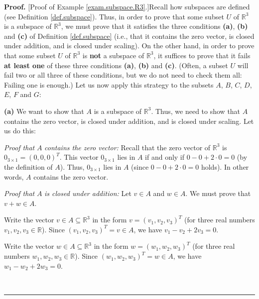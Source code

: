 \documentclass[numbers=enddot,12pt,final,onecolumn,notitlepage]{scrartcl}%
\theoremstyle{definition}
\newenvironment{proof}[1][Proof]{\noindent\textbf{#1.} }{\ \rule{0.5em}{0.5em}}
\begin{document}
\begin{proof}
[Proof of Example \ref{exam.subspace.R3}.]Recall how subspaces are defined
(see Definition \ref{def.subspace}). Thus, in order to prove that some subset
$U$ of $\mathbb{R}^{3}$ is a subspace of $\mathbb{R}^{3}$, we must prove that
it satisfies the three conditions \textbf{(a)}, \textbf{(b)} and \textbf{(c)}
of Definition \ref{def.subspace} (i.e., that it contains the zero vector, is
closed under addition, and is closed under scaling). On the other hand, in
order to prove that some subset $U$ of $\mathbb{R}^{3}$ is \textbf{not} a
subspace of $\mathbb{R}^{3}$, it suffices to prove that it fails \textbf{at
least one} of these three conditions \textbf{(a)}, \textbf{(b)} and
\textbf{(c)}. (Often, a subset $U$ will fail two or all three of these
conditions, but we do not need to check them all: Failing one is enough.) Let
us now apply this strategy to the subsets $A$, $B$, $C$, $D$, $E$, $F$ and $G$:

\textbf{(a)} We want to show that $A$ is a subspace of $\mathbb{R}^{3}$. Thus,
we need to show that $A$ contains the zero vector, is closed under addition,
and is closed under scaling. Let us do this:

\textit{Proof that }$A$\textit{ contains the zero vector:} Recall that the
zero vector of $\mathbb{R}^{3}$ is $0_{3\times1}=\left(  0,0,0\right)  ^{T}$.
This vector $0_{3\times1}$ lies in $A$ if and only if $0-0+2\cdot0=0$ (by the
definition of $A$). Thus, $0_{3\times1}$ lies in $A$ (since $0-0+2\cdot0=0$
holds). In other words, $A$ contains the zero vector.

\textit{Proof that }$A$ \textit{is closed under addition:} Let $v\in A$ and
$w\in A$. We must prove that $v+w\in A$.

Write the vector $v\in A\subseteq\mathbb{R}^{3}$ in the form $v=\left(
v_{1},v_{2},v_{3}\right)  ^{T}$ (for three real numbers $v_{1},v_{2},v_{3}%
\in\mathbb{R}$). Since $\left(  v_{1},v_{2},v_{3}\right)  ^{T}=v\in A$, we
have $v_{1}-v_{2}+2v_{3}=0$.

Write the vector $w\in A\subseteq\mathbb{R}^{3}$ in the form $w=\left(
w_{1},w_{2},w_{3}\right)  ^{T}$ (for three real numbers $w_{1},w_{2},w_{3}%
\in\mathbb{R}$). Since $\left(  w_{1},w_{2},w_{3}\right)  ^{T}=w\in A$, we
have $w_{1}-w_{2}+2w_{3}=0$.


\end{proof}
\end{document}
